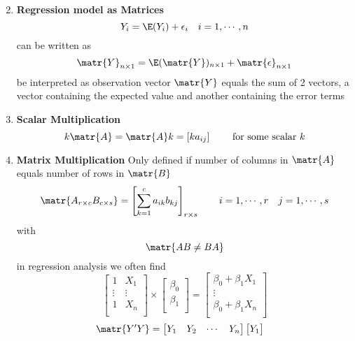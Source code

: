 \documentclass[11pt]{article}
\begin{document}
\begin{defn*}
\begin{enumerate}
\[        \]
        \item \textbf{Regression model as Matrices} 
        \[
            Y_i = \E(Y_i) + \epsilon_i \quad i = 1, \cdots, n 
        \]
        can be written as 
        \[
            \matr{Y}_{n\times 1} = \E(\matr{Y})_{n\times 1} + \matr{\epsilon}_{n\times 1}
        \]
        be interpreted as observation vector $\matr{Y}$ equals the sum of 2 vectors, a vector containing  the expected value and another containing the error terms
        \item \textbf{Scalar Multiplication}
        \[
            k\matr{A} = \matr{A}k = [ka_{ij}] \quad \quad \text{ for some scalar } k
        \] 
        \item \textbf{Matrix Multiplication}
        Only defined if number of columns in $\matr{A}$ equals number of rows in $\matr{B}$
        \[
            \matr{A_{r\times c}B_{c \times s}} = \left[ \sum_{k=1}^c a_{ik} b_{kj} \right]_{r\times s} \quad \quad 
            i = 1, \cdots, r \quad j = 1, \cdots, s
        \]
        with 
        \[
            \matr{AB \neq BA}
        \]
        in regression analysis we often find 
        \[
            \begin{bmatrix}
                1  & X_1 \\
                \vdots & \vdots \\
                1 & X_n \\ 
            \end{bmatrix}
            \times 
            \begin{bmatrix}
                \beta_0 \\
                \beta_1 \\ 
            \end{bmatrix}
            = 
            \begin{bmatrix}
                \beta_0 + \beta_1 X_1 \\
                \vdots \\
                \beta_0 + \beta_1 X_n \\ 
            \end{bmatrix}
        \]
        \begin{align*}
            \matr{Y'Y} &= 
                \begin{bmatrix}
                    Y_1 & Y_2 & \cdots & Y_n \\
                \end{bmatrix}
                \begin{bmatrix}
                    Y_1 \\

\end{bmatrix}
\end{align*}
\end{enumerate}
\end{defn*}
\end{document}
